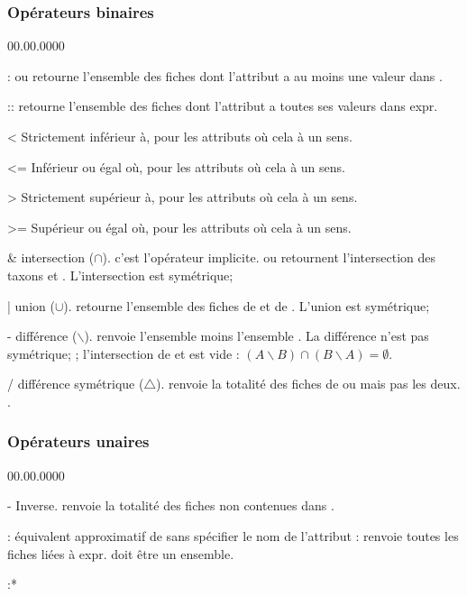 \documentclass[11pt,french]{article}
\begin{document}
\subsubsection{Opérateurs binaires}
\begin{lyxlist}{00.00.0000}
\item [{:}]  ou  retourne l'ensemble
des fiches dont l'attribut  a au moins une valeur dans . 
\item [{::}]  retourne l'ensemble des fiches dont l'attribut
 a toutes ses valeurs dans expr.
\item [{<}] Strictement inférieur à, pour les attributs où cela à un sens.
\item [{<=}] Inférieur ou égal où, pour les attributs où cela à un sens.
\item [{>}] Strictement supérieur à, pour les attributs où cela à un sens.
\item [{>=}] Supérieur ou égal où, pour les attributs où cela à un sens.
\item [{\&}] intersection ($\cap$). c'est l'opérateur implicite. 
ou  retournent l'intersection des taxons  et .
L'intersection est symétrique;  
\item [{|}] union ($\cup$).  retourne l'ensemble des fiches
de  et de . L'union est symétrique; 
\item [{-}] différence ($\backslash$).  renvoie l'ensemble
 moins l'ensemble . La différence n'est pas symétrique;
 ; l'intersection de  et 
est vide : $(A\backslash B)\cap(B\backslash A)=\emptyset$.
\item [{/}] différence symétrique ($\bigtriangleup$).  renvoie
la totalité des fiches de  ou  mais pas les deux.
. 
\end{lyxlist}

\subsubsection{Opérateurs unaires}
\begin{lyxlist}{00.00.0000}
\item [{-}] Inverse.  renvoie la totalité des fiches non contenues
dans . 
\item [{:}] équivalent approximatif de \code{:} sans spécifier le nom
de l'attribut :  renvoie toutes les fiches liées à
expr.  doit être un ensemble.
\item [{:{*}}]  
\end{lyxlist}
\end{document}
